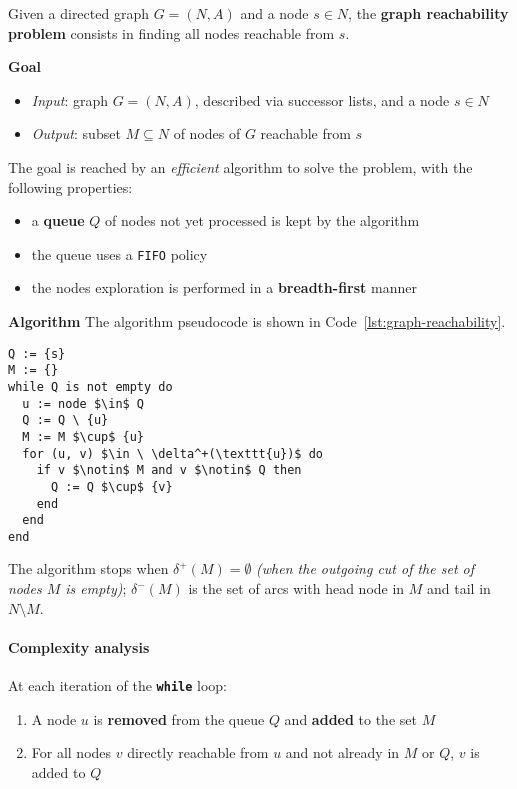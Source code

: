 \documentclass[english]{article}
\begin{document}
\begin{problem}
Given a directed graph \(G = (N, A)\) and a node \(s \in N\), the \textbf{graph reachability problem} consists in finding all nodes reachable from \(s\).
\end{problem}

\bigskip
\textbf{Goal}
\begin{itemize}[label=\(\rightarrow\)]
  \item \textit{Input}: graph \(G = (N, A)\), described via successor lists, and a node \(s \in N\)
  \item \textit{Output}: subset \(M \subseteq N\) of nodes of \(G\) reachable from \(s\)
\end{itemize}

The goal is reached by an \textit{efficient} algorithm to solve the problem, with the following properties:
\begin{itemize}
  \item a \textbf{queue} \(Q\) of nodes not yet processed is kept by the algorithm
  \item the queue uses a \texttt{FIFO} policy
  \item the nodes exploration is performed in a \textbf{breadth-first} manner
\end{itemize}

\bigskip
\textbf{Algorithm}
The algorithm pseudocode is shown in Code~\ref{lst:graph-reachability}.

\begin{lstlisting}[caption={Graph reachability}, label={lst:graph-reachability}, float]
Q := {s}
M := {}
while Q is not empty do
  u := node $\in$ Q
  Q := Q \ {u}
  M := M $\cup$ {u}
  for (u, v) $\in \ \delta^+(\texttt{u})$ do
    if v $\notin$ M and v $\notin$ Q then
      Q := Q $\cup$ {v}
    end
  end
end
\end{lstlisting}

The algorithm stops when \(\delta^+(M) = \emptyset\) \textit{(when the outgoing cut of the set of nodes \(M\) is empty)};
\(\delta^-(M)\) is the set of arcs with head node in \(M\) and tail in \(N \setminus M\).

\paragraph{Complexity analysis}

At each iteration of the \texttt{\textbf{while}} loop:

\begin{enumerate}
  \item A node \(u\) is \textbf{removed} from the queue \(Q\) and \textbf{added} to the set \(M\)
  \item For all nodes \(v\) directly reachable from \(u\) and not already in \(M\) or \(Q\), \(v\) is added to \(Q\)
\end{enumerate}
\end{document}
